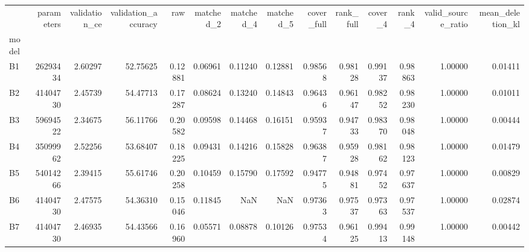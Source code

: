 \begin{tabular}{lrrrrrrrrrrrrr}
\toprule
 & parameters & validation_ce & validation_accuracy & raw & matched_2 & matched_4 & matched_5 & cover_full & rank_full & cover_4 & rank_4 & valid_source_ratio & mean_deletion_kl \\
model &  &  &  &  &  &  &  &  &  &  &  &  &  \\
\midrule
B1 & 26293434 & 2.60297 & 52.75625 & 0.12881 & 0.06961 & 0.11240 & 0.12881 & 0.98568 & 0.98128 & 0.99137 & 0.98863 & 1.00000 & 0.01411 \\
B2 & 41404730 & 2.45739 & 54.47713 & 0.17287 & 0.08624 & 0.13240 & 0.14843 & 0.96436 & 0.96147 & 0.98252 & 0.98230 & 1.00000 & 0.01011 \\
B3 & 59694522 & 2.34675 & 56.11766 & 0.20582 & 0.09598 & 0.14468 & 0.16151 & 0.95937 & 0.94733 & 0.98370 & 0.98048 & 1.00000 & 0.00444 \\
B4 & 35099962 & 2.52256 & 53.68407 & 0.18225 & 0.09431 & 0.14216 & 0.15828 & 0.96387 & 0.95928 & 0.98162 & 0.98123 & 1.00000 & 0.01479 \\
B5 & 54014266 & 2.39415 & 55.61746 & 0.20258 & 0.10459 & 0.15790 & 0.17592 & 0.94775 & 0.94881 & 0.97452 & 0.97637 & 1.00000 & 0.00829 \\
B6 & 41404730 & 2.47575 & 54.36310 & 0.15046 & 0.11845 & NaN & NaN & 0.97363 & 0.97537 & 0.97363 & 0.97537 & 1.00000 & 0.02874 \\
B7 & 41404730 & 2.46935 & 54.43566 & 0.16960 & 0.05571 & 0.08878 & 0.10126 & 0.97534 & 0.96125 & 0.99413 & 0.99148 & 1.00000 & 0.00442 \\
\bottomrule
\end{tabular}
